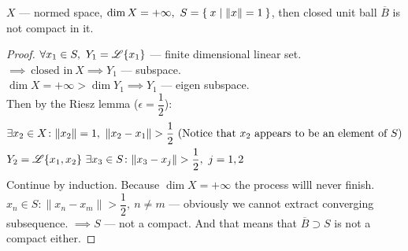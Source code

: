 \begin{cor}
  $X$ --- normed space, $\dim{X} = +\infty,\ S = \Set{x | \|x\| = 1}$, then
  closed unit ball $\overline{B}$ is not compact in it.
\end{cor}

\begin{proof}
  $\forall x_1 \in S,\ Y_1 = \mathscr{L}\{x_1\}$ --- finite dimensional linear set.
  $\implies\ \text{closed in}\ X \implies Y_1$ --- subspace. \\
  $\dim{X} = + \infty > \dim{Y_1} \implies Y_1$ --- eigen subspace. \\
  Then by the Riesz lemma ($\epsilon = \dfrac 12$):
  \begin{align*}
    & \exists x_2 \in X \colon \|x_2\| = 1,\ \|x_2 - x_1\| > \dfrac 12\ \textnormal{(Notice that $x_2$ appears to be an element of $S$)} \\
    & Y_2 = \mathscr{L}\{x_1, x_2\}\ \exists x_3 \in S\colon \|x_3 - x_j\| > \dfrac 12,\ j = 1,2
  \end{align*}
  Continue by induction. Because $\dim{X} = + \infty$ the process willl never
  finish. \\
  $x_n \in S \colon \|x_n - x_m\| > \dfrac 12,\ n \neq m$ --- obviously we
  cannot extract converging subsequence. $\implies S$ --- not a compact. And
  that means that $\overline{B} \supset S$ is not a compact either. 
\end{proof}